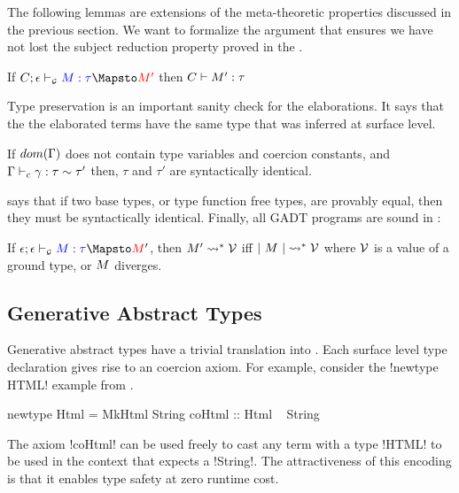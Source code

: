 \documentclass[screen,nonacm,manuscript,review]{acmart} %
\begin{document}
The following lemmas are extensions of the meta-theoretic properties
discussed in the previous section. We want to formalize the argument
that ensures we have not lost the subject reduction property proved in
the .

\begin{lemma}
 If $\GTranslate C \empt \Tm \tau {\Tm'}$ then $C \vdash M' : \tau$
\end{lemma}
Type preservation is an important sanity check for the
elaborations. It says that the the elaborated terms have
the same type that was inferred at surface level.
\begin{theorem}\label{thm:gadt-consistency}
 If $dom(\Gamma)$ does not contain type variables and coercion
 constants, and $\Gamma \vdash_{c} \gamma : \tau\sim\tau'$
 then, $\tau$ and $\tau'$ are syntactically identical.
\end{theorem}
 says that if two base types, or type
function free types, are provably equal, then they must be
syntactically identical. Finally, all GADT programs are sound in \SFC:
\begin{theorem}
 If $\GTranslate \empt \empt \Tm \tau \Tm'$, then $M' \rightsquigarrow^* \mathcal{V}$ iff $|~{M}~| \rightsquigarrow^* \mathcal{V}$ where $\mathcal{V}$ is a
 value of a ground type, or $M$ diverges.
\end{theorem}

\subsection{Generative Abstract Types}\label{sec:fc-encodes-newtypes}
Generative abstract types have a trivial translation into
\SFC. Each surface level type declaration gives rise to an coercion
axiom. For example, consider the !newtype HTML! example from
.

\begin{CenteredBox}
\begin{code}
newtype Html = MkHtml String
coHtml :: Html ~ String
\end{code}
\end{CenteredBox}

The axiom !coHtml! can be used freely to cast any term with a type
!HTML! to be used in the context that expects a !String!. The
attractiveness of this encoding is that it enables type safety at zero
runtime cost.
\end{document}
